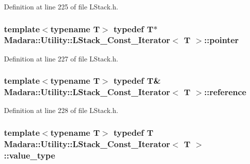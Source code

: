Definition at line 225 of file LStack.h.

\hypertarget{classMadara_1_1Utility_1_1LStack__Const__Iterator_a2a2107e5cc28323409b2c5a8894d08e2}{
\subsubsection[{pointer}]{\setlength{\rightskip}{0pt plus 5cm}template$<$typename T$>$ typedef T$\ast$ {\bf Madara::Utility::LStack\_\-Const\_\-Iterator}$<$ T $>$::{\bf pointer}}}
\label{de/de3/classMadara_1_1Utility_1_1LStack__Const__Iterator_a2a2107e5cc28323409b2c5a8894d08e2}


Definition at line 227 of file LStack.h.

\hypertarget{classMadara_1_1Utility_1_1LStack__Const__Iterator_acd1e4824adc5fa88082861477b0fed8f}{
\subsubsection[{reference}]{\setlength{\rightskip}{0pt plus 5cm}template$<$typename T$>$ typedef T\& {\bf Madara::Utility::LStack\_\-Const\_\-Iterator}$<$ T $>$::{\bf reference}}}
\label{de/de3/classMadara_1_1Utility_1_1LStack__Const__Iterator_acd1e4824adc5fa88082861477b0fed8f}


Definition at line 228 of file LStack.h.

\hypertarget{classMadara_1_1Utility_1_1LStack__Const__Iterator_ab91d664086c94ae01dd44bbac1e2fd47}{
\subsubsection[{value\_\-type}]{\setlength{\rightskip}{0pt plus 5cm}template$<$typename T$>$ typedef T {\bf Madara::Utility::LStack\_\-Const\_\-Iterator}$<$ T $>$::{\bf value\_\-type}}}
\label{de/de3/classMadara_1_1Utility_1_1LStack__Const__Iterator_ab91d664086c94ae01dd44bbac1e2fd47}


